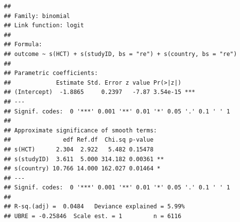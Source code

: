 \documentclass[]{article}
\newenvironment{Shaded}{\begin{snugshade}}{\end{snugshade}}
\newcommand{\KeywordTok}[1]{\textcolor[rgb]{0.13,0.29,0.53}{\textbf{#1}}}
\newcommand{\DataTypeTok}[1]{\textcolor[rgb]{0.13,0.29,0.53}{#1}}
\newcommand{\DecValTok}[1]{\textcolor[rgb]{0.00,0.00,0.81}{#1}}
\newcommand{\StringTok}[1]{\textcolor[rgb]{0.31,0.60,0.02}{#1}}
\newcommand{\OperatorTok}[1]{\textcolor[rgb]{0.81,0.36,0.00}{\textbf{#1}}}
\newcommand{\NormalTok}[1]{#1}
\begin{document}
\begin{verbatim}
## 
## Family: binomial 
## Link function: logit 
## 
## Formula:
## outcome ~ s(HCT) + s(studyID, bs = "re") + s(country, bs = "re")
## 
## Parametric coefficients:
##             Estimate Std. Error z value Pr(>|z|)    
## (Intercept)  -1.8865     0.2397   -7.87 3.54e-15 ***
## ---
## Signif. codes:  0 '***' 0.001 '**' 0.01 '*' 0.05 '.' 0.1 ' ' 1
## 
## Approximate significance of smooth terms:
##               edf Ref.df  Chi.sq p-value   
## s(HCT)      2.304  2.922   5.482 0.15478   
## s(studyID)  3.611  5.000 314.182 0.00361 **
## s(country) 10.766 14.000 162.027 0.01464 * 
## ---
## Signif. codes:  0 '***' 0.001 '**' 0.01 '*' 0.05 '.' 0.1 ' ' 1
## 
## R-sq.(adj) =  0.0484   Deviance explained = 5.99%
## UBRE = -0.25846  Scale est. = 1         n = 6116
\end{verbatim}

\begin{Shaded}
\end{Shaded}
\end{document}
